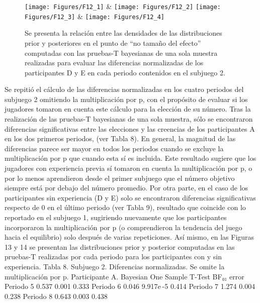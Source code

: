\begin{figure}[hp]
\centering
\texttt{[image: Figures/F12\_1]} & \texttt{[image: Figures/F12\_2]} 
\texttt{[image: Figures/F12\_3]} & \texttt{[image: Figures/F12\_4]} 
\decoRule
\caption[Evaluación de las Diferencias Relativas entre creencias y elecciones en el Subjuego 1 sin la multiplicación por p (Factor de Bayes)]{Se presenta la relación entre las densidades de las distribuciones prior y posteriores en el punto de “no tamaño del efecto” computadas con las pruebas-T bayesianas de una sola muestra realizadas para evaluar las diferencias normalizadas de los participantes D y E en cada periodo contenidos en el subjuego 2.}
\label{fig:DN_S2_DyE}
\end{figure}  


Se repitió el cálculo de las diferencias normalizadas en los cuatro periodos del subjuego 2 omitiendo la multiplicación por p, con el propósito de evaluar si los jugadores tomaron en cuenta este cálculo para la elección de su número. Tras la realización de las pruebas-T bayesianas de una sola muestra,  sólo se encontraron diferencias significativas entre las elecciones y las creencias de los participantes A en los dos primeros  periodos, (ver Tabla 8). En general, la magnitud de las diferencias parece ser mayor en todos los periodos cuando se excluye la multiplicación por p que cuando esta sí es incluida. Este resultado sugiere que los jugadores con experiencia previa sí tomaron en cuenta la multiplicación por p, o por lo menos aprendieron desde el primer subjuego que el número objetivo siempre está por debajo del número promedio.
Por otra parte, en el caso de los participantes sin experiencia (D y E) solo se encontraron diferencias significativas respecto de 0 en el último periodo (ver Tabla 9), resultado que coincide con lo reportado en el subjuego 1, sugiriendo nuevamente que los participantes incorporaron la multiplicación por p (o comprendieron la tendencia del juego hacia el equilibrio)  solo después de varias repeticiones. Así mismo, en las Figuras 13 y 14 se presentan las distribuciones prior y posterior computadas en las pruebas-T realizadas por cada periodo para los participantes con y sin experiencia.
Tabla 8. Subjuego 2. Diferencias normalizadas. Se omite la multiplicación por p. Participante A.
Bayesian One Sample T-Test	
	BF₀₁	error %
Periodo 5		0.537		0.001		0.333 
Periodo 6		0.046		9.917e -5		0.414 
Periodo 7		1.274		0.004		0.238 
Periodo 8		0.643		0.003		0.438 
	
